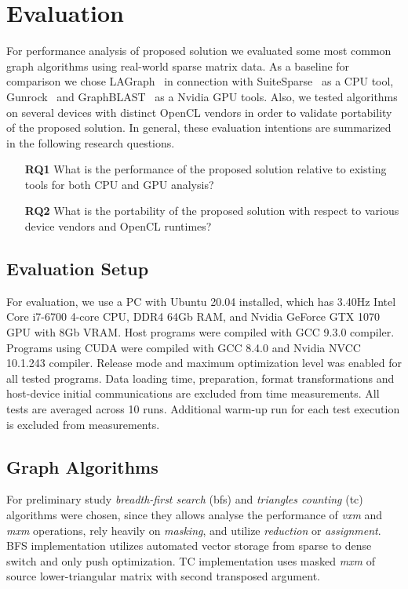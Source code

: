 \section{Evaluation}

For performance analysis of proposed solution we evaluated some most common graph algorithms using real-world sparse matrix data. 
As a baseline for comparison we chose LAGraph~\cite{szarnyas2021lagraph} in connection with SuiteSparse~\cite{10.1145/3322125} as a CPU tool, Gunrock~\cite{7967137} and GraphBLAST~\cite{yang2019graphblast} as a Nvidia GPU tools. 
Also, we tested algorithms on several devices with distinct OpenCL vendors in order to validate portability of the proposed solution. 
In general, these evaluation intentions are summarized in the following research questions. 

\vspace{0.2cm}
\begin{itemize}
    \item[\textbf{RQ1}] What is the performance of the proposed solution relative to existing tools for both CPU and GPU analysis?
    
    \item[\textbf{RQ2}] What is the portability of the proposed solution with respect to various device vendors and OpenCL runtimes?
\end{itemize}

\subsection{Evaluation Setup}

For evaluation, we use a PC with Ubuntu 20.04 installed, which has 3.40Hz Intel Core i7-6700 4-core CPU, DDR4 64Gb RAM, and Nvidia GeForce GTX 1070 GPU with 8Gb VRAM. 
Host programs were compiled with GCC 9.3.0 compiler. Programs using CUDA were compiled with GCC 8.4.0 and Nvidia NVCC 10.1.243 compiler.
Release mode and maximum optimization level was enabled for all tested programs. 
Data loading time, preparation, format transformations and host-device initial communications are excluded from time measurements. 
All tests are averaged across 10 runs.
Additional warm-up run for each test execution is excluded from measurements.

\subsection{Graph Algorithms}

For preliminary study \textit{breadth-first search} (bfs) and \textit{triangles counting} (tc) algorithms were chosen, since they allows analyse the performance of \textit{vxm} and \textit{mxm} operations, rely heavily on \textit{masking}, and utilize \textit{reduction} or \textit{assignment}. 
BFS implementation utilizes automated vector storage from sparse to dense switch and only \textit{}{push optimization}. 
TC implementation uses masked \textit{mxm} of source lower-triangular matrix with second transposed argument.

